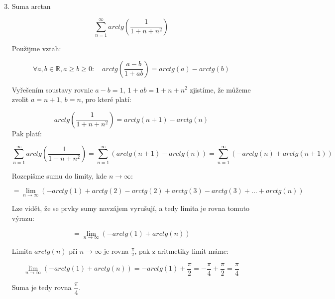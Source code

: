 \documentclass[12pt]{article}
\begin{document}
\begin{enumerate}
  \setcounter{enumi}{2}
  
  \item Suma arctan

    \[
      \sum_{n=1}^{\infty} arctg \left( \frac{1}{1+n+n^2}\right)
    \]

    Použijme vztah:

    \[
      \forall a,b\in\mathbb{R},a\geq b\geq 0: \quad arctg \left( \frac{a-b}{1+ab} \right) = arctg(a) - arctg(b)
    \]

    Vyřešením soustavy rovnic $a-b=1,\ 1+ab=1+n+n^2$ zjistíme, že můžeme zvolit $a=n+1,\ b=n$, pro které platí:
    
    \[
      arctg  \left( \frac{1}{1+n+n^2}\right)  = arctg(n+1) - arctg(n)
    \]
    Pak platí:

    \[
      \sum_{n=1}^{\infty} arctg \left( \frac{1}{1+n+n^2}\right) = \sum_{n=1}^{\infty} \left( arctg(n+1) - arctg(n) \right)
      = \sum_{n=1}^{\infty} \left(  - arctg(n) + arctg(n+1) \right)
    \]

    Rozepišme sumu do limity, kde $n\to\infty$:

    \[
      = \lim_{n\to\infty} \left( - arctg(1) + arctg(2) - arctg(2) + arctg(3) - arctg(3) + ... + arctg(n) \right)
    \]

    Lze vidět, že se prvky sumy navzájem vyrušují, a tedy limita je rovna tomuto výrazu:

    \[
      = \lim_{n\to\infty} \left( -arctg(1) + arctg(n) \right)
    \]

    Limita $arctg(n)$ při $n\to\infty$ je rovna $\frac{\pi}{2}$, pak z aritmetiky limit máme:

    \[
      \lim_{n\to\infty} \left( -arctg(1) + arctg(n) \right) = -arctg(1) + \frac{\pi}{2} = -\frac{\pi}{4}+\frac{\pi}{2} = \frac{\pi}{4}
    \]

    Suma je tedy rovna $\dfrac{\pi}{4}$.

\end{enumerate}
\end{document}
